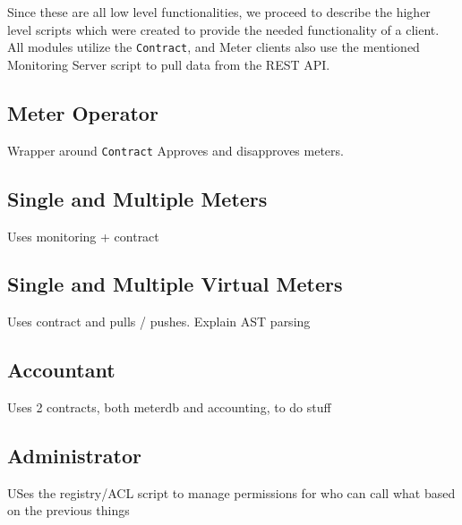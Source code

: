 Since these are all low level functionalities, we proceed to describe the higher level scripts which were created to provide the needed functionality of a client. All modules utilize the \texttt{Contract}, and Meter clients also use the mentioned Monitoring Server script to pull data from the REST API.

\subsection{Meter Operator}
Wrapper around \texttt{Contract}
Approves and disapproves meters.
\subsection{Single and Multiple Meters}
Uses monitoring + contract
\subsection{Single and Multiple Virtual Meters}
Uses contract and pulls / pushes. Explain AST parsing
\subsection{Accountant}
Uses 2 contracts, both meterdb and accounting, to do stuff
\subsection{Administrator}
USes the registry/ACL script to manage permissions for who can call what based on the previous things




